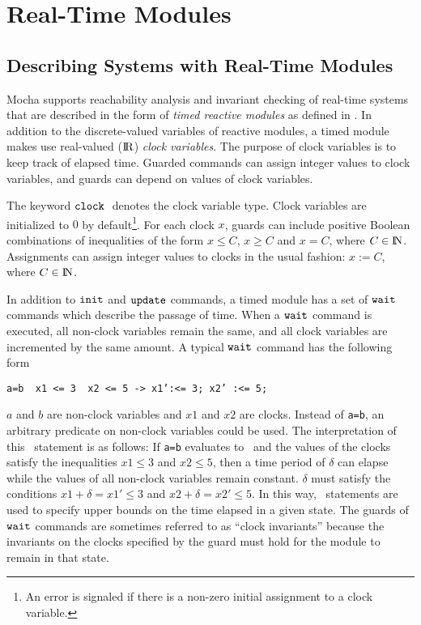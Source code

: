 \chapter{Real-Time Modules}
\label{sec:real_time}
\label{chap:real_time}
\label{sec:rtm}

\section{Describing Systems with Real-Time Modules}
{\sc Mocha} supports reachability analysis and invariant checking of
real-time systems that are described in the form of {\em timed
reactive modules} as defined in  \cite{AlurHenzinger97}. In addition to
the discrete-valued variables of 
reactive modules, a timed module makes use real-valued (${\rm I\!R}$) {\em clock
variables}. The purpose of clock variables is to keep track of
elapsed time. Guarded commands can assign integer values to clock
variables, and guards can depend on values of clock variables. 

The keyword ${\tt clock}\;$ denotes the clock variable type. Clock variables 
are initialized to $0$ by default\footnote{
An error is signaled if there is a non-zero initial assignment to a
clock variable.}. For each clock $x$, guards can include positive
Boolean combinations of inequalities of the form $x \leq C$, $x \geq C$
and $x=C$, where $C \in {\rm I\!N}$. Assignments can assign integer values
to clocks in the usual fashion: $x := C$, where $C \in {\rm I\!N}$.

In addition to $\mbox{\tt init}$ and $\mbox{\tt update}$ commands, a timed module has a
set of $\mbox{\tt wait}$ commands which describe the passage of time. When a
$\mbox{\tt wait}$ command is executed, all non-clock variables remain the same,
and all clock variables are incremented by the same amount. A typical
$\mbox{\tt wait}$ command has the following form

\begin{center}
\tt a=b \AND\ x1 <= 3 \AND\ x2 <= 5 -> x1':<= 3; x2' :<= 5;
\end{center}

\mypar
$a$ and $b$ are non-clock variables and $x1$ and $x2$ are clocks.
Instead of {\tt a=b}, an arbitrary predicate on non-clock variables
could be used. 
The interpretation of this \WAIT\ statement is as
follows: If {\tt a=b} evaluates to \TRUE\ and the
values of the clocks satisfy the inequalities $x1 \leq 3$ and $x2
\leq 5$, then a time period of $\delta$ can elapse while the values of
all non-clock variables remain constant. $\delta$ must satisfy the
conditions $x1 + \delta = x1' \leq 3$ and $x2 + \delta = x2' \leq 5$.
In this way, \WAIT\
statements are used to specify upper bounds on the time elapsed in a
given state. The guards of $\mbox{\tt wait}$ commands are sometimes referred to
as ``clock invariants'' because the invariants on the clocks specified
by the guard must hold for the module to remain in that state.

